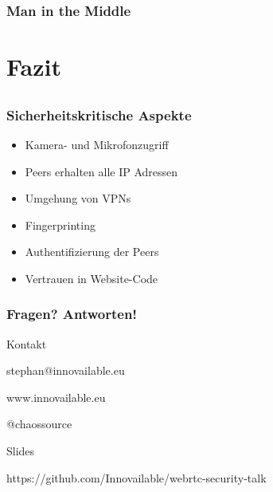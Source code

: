 \documentclass[12pt]{beamer}
\begin{document}
\begin{frame}
  \frametitle{Man in the Middle}
  \centerline{}
\end{frame}


\section{Fazit}
\subsection{}

\begin{frame}
  \frametitle{Sicherheitskritische Aspekte}
  \begin{itemize}
    \item Kamera- und Mikrofonzugriff
    \item Peers erhalten alle IP Adressen
    \item Umgehung von VPNs
    \item Fingerprinting
    \item Authentifizierung der Peers
    \item Vertrauen in Website-Code
  \end{itemize}
\end{frame}

\begin{frame}
  \frametitle{Fragen? Antworten!}

  \centerline{\scriptsize{Kontakt}}
  \centerline{stephan@innovailable.eu}
  \centerline{www.innovailable.eu}
  \centerline{@chaossource}

  \vspace{0.2in}

  \centerline{\scriptsize{Slides}}
  \centerline{https://github.com/Innovailable/webrtc-security-talk}
\end{frame}
\end{document}
